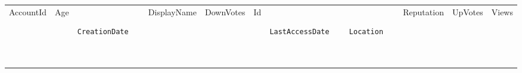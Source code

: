 \documentclass[12pt,a4paper,twoside,openright,titlepage,final]{article}
\begin{document}
\begin{enumerate}
	 
	\begin{longtable}[]{@{}lllllllllll@{}}
		\label{tbl:mas_reciente}\\
		\toprule
		\begin{minipage}[t]{0.06\columnwidth}\raggedright\strut
			AccountId
			\strut\end{minipage} &
		\begin{minipage}[t]{0.03\columnwidth}\raggedright\strut
			Age
			\strut\end{minipage} &
		\begin{minipage}[t]{0.12\columnwidth}\raggedright\strut
			\begin{verbatim}
			CreationDate
			\end{verbatim}
			\strut\end{minipage} &
		\begin{minipage}[t]{0.07\columnwidth}\raggedright\strut
			DisplayName
			\strut\end{minipage} &
		\begin{minipage}[t]{0.06\columnwidth}\raggedright\strut
			DownVotes
			\strut\end{minipage} &
		\begin{minipage}[t]{0.02\columnwidth}\raggedright\strut
			Id
			\strut\end{minipage} &
		\begin{minipage}[t]{0.12\columnwidth}\raggedright\strut
			\begin{verbatim}
			LastAccessDate
			\end{verbatim}
			\strut\end{minipage} &
		\begin{minipage}[t]{0.11\columnwidth}\raggedright\strut
			\begin{verbatim}
			Location
			\end{verbatim}
			\strut\end{minipage} &
		\begin{minipage}[t]{0.06\columnwidth}\raggedright\strut
			Reputation
			\strut\end{minipage} &
		\begin{minipage}[t]{0.04\columnwidth}\raggedright\strut
			UpVotes
			\strut\end{minipage} &
		\begin{minipage}[t]{0.04\columnwidth}\raggedright\strut
			Views
			\strut\end{minipage}\tabularnewline
		\begin{minipage}[t]{0.06\columnwidth}\raggedright\strut
			\begin{verbatim}

\end{verbatim}
\end{minipage}
\end{longtable}
\end{enumerate}
\end{document}
